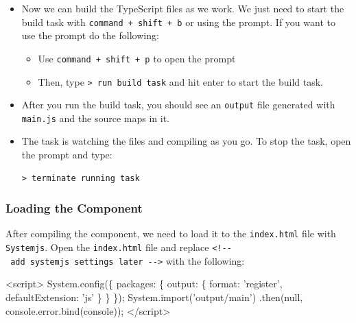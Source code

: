 \documentclass[12pt,]{article}
\newenvironment{Shaded}{}{}
\newcommand{\KeywordTok}[1]{\textcolor[rgb]{0.00,0.00,1.00}{{#1}}}
\newcommand{\DataTypeTok}[1]{{#1}}
\newcommand{\StringTok}[1]{\textcolor[rgb]{0.00,0.50,0.50}{{#1}}}
\newcommand{\SpecialStringTok}[1]{\textcolor[rgb]{0.00,0.50,0.50}{{#1}}}
\newcommand{\VariableTok}[1]{{#1}}
\newcommand{\OperatorTok}[1]{{#1}}
\newcommand{\AttributeTok}[1]{{#1}}
\newcommand{\NormalTok}[1]{{#1}}
\begin{document}
\begin{itemize}
\item
  Now we can build the TypeScript files as we work. We just need to
  start the build task with \texttt{command\ +\ shift\ +\ b} or using
  the prompt. If you want to use the prompt do the following:

  \begin{itemize}
  \item
    Use \texttt{command\ +\ shift\ +\ p} to open the prompt
  \item
    Then, type \texttt{\textgreater{}\ run\ build\ task} and hit enter
    to start the build task.
  \end{itemize}
\item
  After you run the build task, you should see an \texttt{output} file
  generated with \texttt{main.js} and the source maps in it.
\item
  The task is watching the files and compiling as you go. To stop the
  task, open the prompt and type:

\begin{verbatim}
> terminate running task
\end{verbatim}
\end{itemize}

\subsubsection{Loading the Component}\label{loading-the-component}

After compiling the component, we need to load it to the
\texttt{index.html} file with \texttt{Systemjs}. Open the
\texttt{index.html} file and replace
\texttt{\textless{}!-\/-\ add\ systemjs\ settings\ later\ -\/-\textgreater{}}
with the following:

\begin{Shaded}
\begin{Highlighting}[numbers=left,,]
\KeywordTok{<script>}
  \VariableTok{System}\NormalTok{.}\AttributeTok{config}\NormalTok{(}\OperatorTok{\{}
    \DataTypeTok{packages}\OperatorTok{:} \OperatorTok{\{}
      \DataTypeTok{output}\OperatorTok{:} \OperatorTok{\{}
        \DataTypeTok{format}\OperatorTok{:} \StringTok{'register'}\OperatorTok{,}
        \DataTypeTok{defaultExtension}\OperatorTok{:} \StringTok{'js'}
      \OperatorTok{\}}
    \OperatorTok{\}}
  \OperatorTok{\}}\NormalTok{)}\OperatorTok{;}
  \VariableTok{System}\NormalTok{.}\AttributeTok{import}\NormalTok{(}\StringTok{'output/main'}\NormalTok{)}
  \NormalTok{.}\AttributeTok{then}\NormalTok{(}\KeywordTok{null}\OperatorTok{,} \VariableTok{console}\NormalTok{.}\VariableTok{error}\NormalTok{.}\AttributeTok{bind}\NormalTok{(console))}\OperatorTok{;}
\OperatorTok{<}\SpecialStringTok{/script>}
\end{Highlighting}
\end{Shaded}
\end{document}
